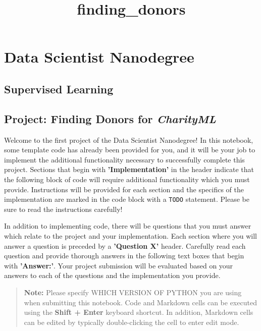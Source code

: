 \documentclass[11pt]{article}
\title{finding\_donors}
\begin{document}
    
    
    \maketitle
    
    

    
    \section{Data Scientist Nanodegree}\label{data-scientist-nanodegree}

\subsection{Supervised Learning}\label{supervised-learning}

\subsection{\texorpdfstring{Project: Finding Donors for
\emph{CharityML}}{Project: Finding Donors for CharityML}}\label{project-finding-donors-for-charityml}

    Welcome to the first project of the Data Scientist Nanodegree! In this
notebook, some template code has already been provided for you, and it
will be your job to implement the additional functionality necessary to
successfully complete this project. Sections that begin with
\textbf{'Implementation'} in the header indicate that the following
block of code will require additional functionality which you must
provide. Instructions will be provided for each section and the
specifics of the implementation are marked in the code block with a
\texttt{\textquotesingle{}TODO\textquotesingle{}} statement. Please be
sure to read the instructions carefully!

In addition to implementing code, there will be questions that you must
answer which relate to the project and your implementation. Each section
where you will answer a question is preceded by a \textbf{'Question X'}
header. Carefully read each question and provide thorough answers in the
following text boxes that begin with \textbf{'Answer:'}. Your project
submission will be evaluated based on your answers to each of the
questions and the implementation you provide.

\begin{quote}
\textbf{Note:} Please specify WHICH VERSION OF PYTHON you are using when
submitting this notebook. Code and Markdown cells can be executed using
the \textbf{Shift + Enter} keyboard shortcut. In addition, Markdown
cells can be edited by typically double-clicking the cell to enter edit
mode.
\end{quote}
\end{document}
